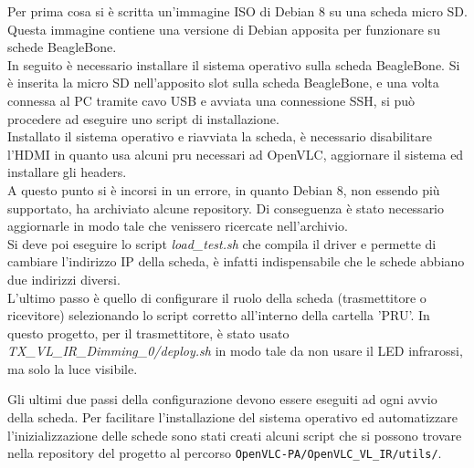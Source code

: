 Per prima cosa si è scritta un'immagine ISO di Debian 8 su una scheda micro SD. Questa immagine contiene una versione di Debian apposita per funzionare su schede BeagleBone.\\
In seguito è necessario installare il sistema operativo sulla scheda BeagleBone. Si è inserita la micro SD nell'apposito slot sulla scheda BeagleBone, e una volta connessa al PC tramite cavo USB e avviata una connessione SSH, si può procedere ad eseguire uno script di installazione.\\
Installato il sistema operativo e riavviata la scheda, è necessario disabilitare l'HDMI in quanto usa alcuni \gls{pru} necessari ad OpenVLC, aggiornare il sistema ed installare gli headers.\\
A questo punto si è incorsi in un errore, in quanto Debian 8, non essendo più supportato, ha archiviato alcune repository. Di conseguenza è stato necessario aggiornarle in modo tale che venissero ricercate nell'archivio.\\
Si deve poi eseguire lo script \textit{load\_test.sh} che compila il driver e permette di cambiare l'indirizzo IP della scheda, è infatti indispensabile che le schede abbiano due indirizzi diversi.\\
L'ultimo passo è quello di configurare il ruolo della scheda (trasmettitore o ricevitore) selezionando lo script corretto all'interno della cartella 'PRU'. In questo progetto, per il trasmettitore, è stato usato \textit{TX\_VL\_IR\_Dimming\_0/deploy.sh} in modo tale da non usare il LED infrarossi, ma solo la luce visibile.

Gli ultimi due passi della configurazione devono essere eseguiti ad ogni avvio della scheda. Per facilitare l'installazione del sistema operativo ed automatizzare l'inizializzazione delle schede sono stati creati alcuni script che si possono trovare nella repository del progetto al percorso \texttt{OpenVLC-PA/OpenVLC\_VL\_IR/utils/}.
